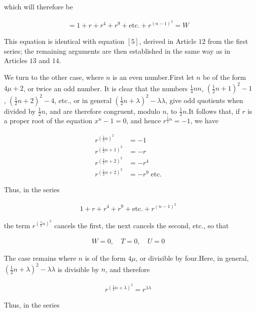 which will therefore be

\[
\begin{aligned}
=1+r+r^4+r^9+\text{etc.}+r^{(n-1)^2}=W
\end{aligned}
\]

This equation is identical with equation $[5]$, derived in Article $12$ from the first series; the remaining arguments are then established in the same way as in Articles $13$ and $14$.



We turn to the other case, where $n$ is an even number.\quad First let $n$ be of the form $4\mu+2$, or twice an odd number. It is clear that the numbers $\frac14nn$, $(\frac12n+1)^2-1$, $(\frac12n+2)^2-4$, etc., or in general $(\frac12n+\lambda)^2-\lambda\lambda$, give odd quotients when divided by $\frac12n$, and are therefore congruent, modulo $n$, to $\frac12n$.\quad It follows that, if $r$ is a proper root of the equation $x^n-1=0$, and hence $r^{\frac12n}=-1$, we have

\[
\begin{aligned}
r^{(\frac12n)^2}&=-1\\
r^{(\frac12n+1)^2}&=-r\\
r^{(\frac12n+2)^2}&=-r^4\\
r^{(\frac12n+2)^2}&=-r^9\;\text{etc.}
\end{aligned}
\]

Thus, in the series

\[
\begin{aligned}
1+r+r^4+r^9+\text{etc.}+r^{(n-1)^2}
\end{aligned}
\]

the term $r^{(\frac12n)^2}$ cancels the first, the next cancels the second, etc., so that

\[
\begin{aligned}
W=0,\quad T=0,\quad U=0
\end{aligned}
\]


The case remains where $n$ is of the form $4\mu$, or divisible by four.\quad Here, in general, $(\frac12n+\lambda)^2-\lambda\lambda$ is divisible by $n$, and therefore

\[
\begin{aligned}
r^{(\frac12n+\lambda)^2}=r^{\lambda\lambda}
\end{aligned}
\]

Thus, in the series

